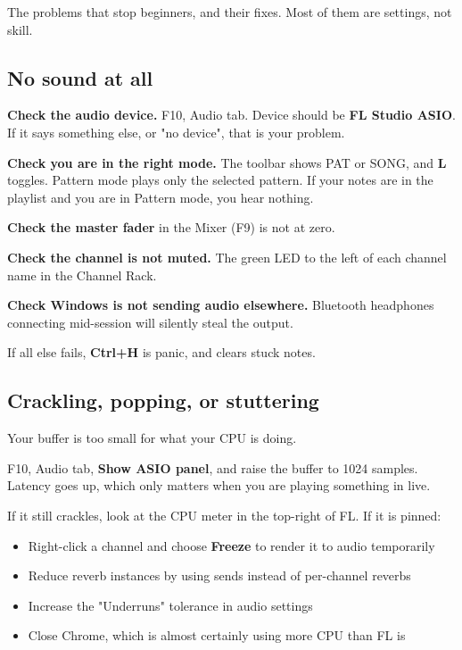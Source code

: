 The problems that stop beginners, and their fixes. Most of them are settings, not skill.

\subsection{No sound at all}\label{fl06_trouble-no-sound-at-all}

\textbf{Check the audio device.} F10, Audio tab. Device should be \textbf{FL Studio ASIO}. If it says
something else, or "no device", that is your problem.

\textbf{Check you are in the right mode.} The toolbar shows PAT or SONG, and \textbf{L} toggles.
Pattern mode plays only the selected pattern. If your notes are in the playlist and you are
in Pattern mode, you hear nothing.

\textbf{Check the master fader} in the Mixer (F9) is not at zero.

\textbf{Check the channel is not muted.} The green LED to the left of each channel name in the
Channel Rack.

\textbf{Check Windows is not sending audio elsewhere.} Bluetooth headphones connecting mid-session
will silently steal the output.

If all else fails, \textbf{Ctrl+H} is panic, and clears stuck notes.

\subsection{Crackling, popping, or stuttering}\label{fl06_trouble-crackling-popping-or-stuttering}

Your buffer is too small for what your CPU is doing.

F10, Audio tab, \textbf{Show ASIO panel}, and raise the buffer to 1024 samples. Latency goes up,
which only matters when you are playing something in live.

If it still crackles, look at the CPU meter in the top-right of FL. If it is pinned:

\begin{itemize}
\tightlist
\item
  Right-click a channel and choose \textbf{Freeze} to render it to audio temporarily
\item
  Reduce reverb instances by using sends instead of per-channel reverbs
\item
  Increase the "Underruns" tolerance in audio settings
\item
  Close Chrome, which is almost certainly using more CPU than FL is
\end{itemize}


